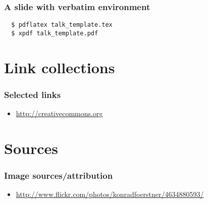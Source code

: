 \documentclass{beamer}
\begin{document}
\begin{frame}[fragile] %
    \frametitle{A slide with verbatim environment}
    \begin{block}{}
      \begin{verbatim}
  $ pdflatex talk_template.tex
  $ xpdf talk_template.pdf
    \end{verbatim}
    \end{block}
\end{frame}

\section*{Link collections}

\begin{frame}
  \frametitle{Selected links}
   {\tiny
     \begin{block}{}
       \begin{itemize}
       \item \url{http://creativecommons.org}
      \end{itemize}
  \end{block}
}
\end{frame}

\section*{Sources}

\begin{frame}
  \frametitle{Image sources/attribution}
   {\tiny
     \begin{block}{}
       \begin{itemize}
       \item \url{http://www.flickr.com/photos/konradfoerstner/4634880593/}
      \end{itemize}
  \end{block}
}
\end{frame}
\end{document}
